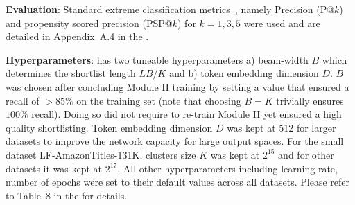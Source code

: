 \clearpage



\textbf{Evaluation}: Standard extreme classification metrics~\cite{Babbar19, Prabhu14, Prabhu18b, You18, Liu17}, namely Precision (P@$k$) and propensity scored precision (PSP@$k$) for $k= 1, 3, 5$ were used and are detailed in Appendix~A.4 in the \suppl.

\textbf{Hyperparameters}: \alg has two tuneable hyperparameters a) beam-width $B$ which determines the shortlist length $LB/K$ and b) token embedding dimension $D$. $B$ was chosen after concluding Module II training by setting a value that ensured a recall of $>85\%$ on the training set (note that choosing $B = K$ trivially ensures $100\%$ recall). Doing so did not require \alg to re-train Module II yet ensured a high quality shortlisting. Token embedding dimension $D$ was kept at 512 for larger datasets to improve the network capacity for large output spaces. For the small dataset LF-AmazonTitles-131K, clusters size $K$ was kept at $2^{15}$ and for other datasets it was kept at $2^{17}$. All other hyperparameters including learning rate, number of epochs were set to their default values across all datasets. Please refer to Table~8 in the \suppl for details.




